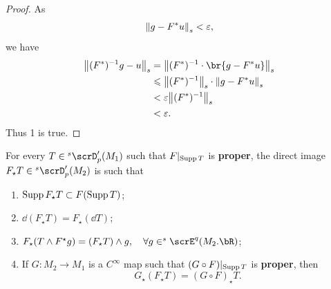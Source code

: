\documentclass[lang=cn,zihao=-4,a4paper,fontset=none]{beautybook}
\begin{document}
\begin{proof}
    As     
    \begin{align*}
        \norm{g-F^*u}_s<\varepsilon,
    \end{align*}
    we have
\begin{align*}
    \norm{(F^*)^{-1} g-u}_s &=\norm{(F^*)^{-1}\cdot \br{g-F^* u}}_s\\ 
    &\leqslant  \norm{(F^*)^{-1}}_s\cdot \norm{g-F^* u}_s\\ 
    &< \varepsilon \norm{(F^*)^{-1}}_s\\ 
    &<\varepsilon.
\end{align*}
    Thus 1 is true.
        
\end{proof}
    

\begin{theorem}[][][thm:2.14]
    For every $T\in {}^s\scrD'_p(M_1)$ such that $F|_{\operatorname{Supp} T}$ is \textbf{proper}, the direct image $F_\star T\in {}^s\scrD'_p(M_2)$ is such that
    \begin{enumerate}
        \item $\operatorname{Supp} F_\star T\subset F(\operatorname{Supp} T)$;
        \item $\dd (F_\star T)=F_\star (\dd T)$;
        \item $F_\star (T\wedge F^\star g)=(F_\star T)\wedge g, \quad \forall g\in ^s\scrE^q(M_2.\bR)$;
        \item If $G\colon M_2\to M_1$ is a $C^\infty$ map such that $(G\circ F)|_{\operatorname{Supp} T}$ is \textbf{proper}, then 
        \[G_\star (F_\star T)=(G\circ F)_\star T.\]
    \end{enumerate}
\end{theorem}
    
\end{document}
